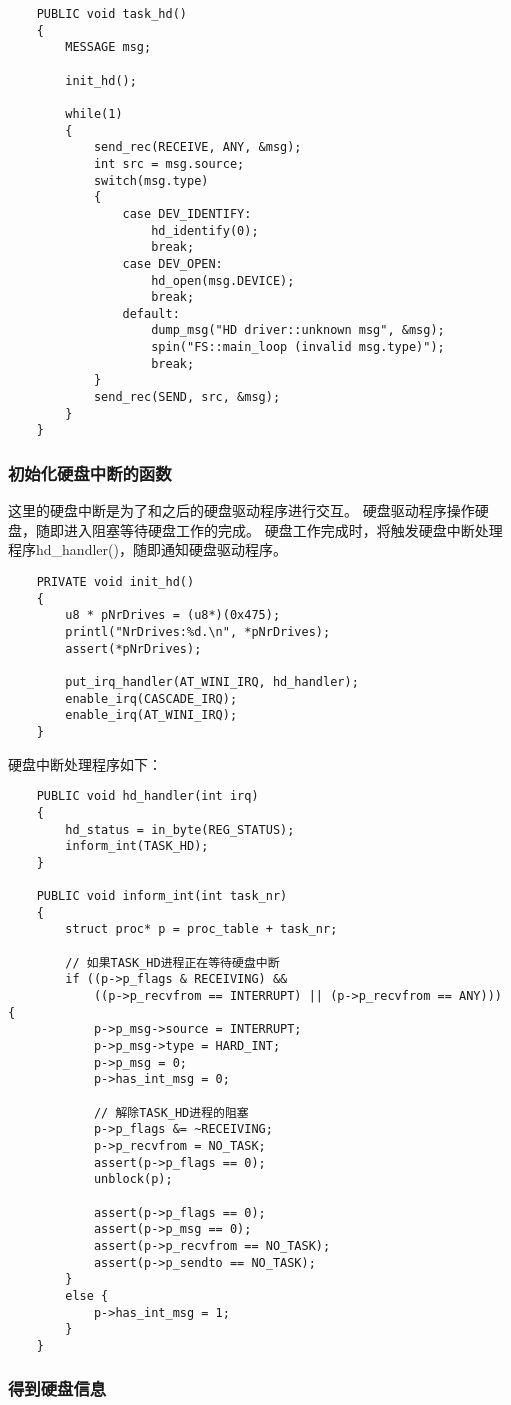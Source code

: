 \documentclass[a4paper,left=2.5cm,right=2.5cm,11pt]{article}
\begin{document}
	\begin{lstlisting}
	PUBLIC void task_hd()
	{
		MESSAGE msg;

		init_hd();

		while(1)
		{
			send_rec(RECEIVE, ANY, &msg);
			int src = msg.source;
			switch(msg.type)
			{
				case DEV_IDENTIFY:
					hd_identify(0);
					break;
				case DEV_OPEN:
					hd_open(msg.DEVICE);
					break;
				default:
					dump_msg("HD driver::unknown msg", &msg);
					spin("FS::main_loop (invalid msg.type)");
					break;
			}
			send_rec(SEND, src, &msg);
		}
	}
	\end{lstlisting}

\subsubsection{初始化硬盘中断的函数}
	这里的硬盘中断是为了和之后的硬盘驱动程序进行交互。
	硬盘驱动程序操作硬盘，随即进入阻塞等待硬盘工作的完成。
	硬盘工作完成时，将触发硬盘中断处理程序hd\_handler()，随即通知硬盘驱动程序。

	\begin{lstlisting}
	PRIVATE void init_hd()
	{
		u8 * pNrDrives = (u8*)(0x475);
		printl("NrDrives:%d.\n", *pNrDrives);
		assert(*pNrDrives);

		put_irq_handler(AT_WINI_IRQ, hd_handler);
		enable_irq(CASCADE_IRQ);
		enable_irq(AT_WINI_IRQ);
	}
	\end{lstlisting}

	硬盘中断处理程序如下：
	\begin{lstlisting}
	PUBLIC void hd_handler(int irq)
	{
		hd_status = in_byte(REG_STATUS);
		inform_int(TASK_HD);
	}

	PUBLIC void inform_int(int task_nr)
	{
		struct proc* p = proc_table + task_nr;

		// 如果TASK_HD进程正在等待硬盘中断
		if ((p->p_flags & RECEIVING) && 
			((p->p_recvfrom == INTERRUPT) || (p->p_recvfrom == ANY))) {
			p->p_msg->source = INTERRUPT;
			p->p_msg->type = HARD_INT;
			p->p_msg = 0;
			p->has_int_msg = 0;
			
			// 解除TASK_HD进程的阻塞
			p->p_flags &= ~RECEIVING; 
			p->p_recvfrom = NO_TASK;
			assert(p->p_flags == 0);
			unblock(p);

			assert(p->p_flags == 0);
			assert(p->p_msg == 0);
			assert(p->p_recvfrom == NO_TASK);
			assert(p->p_sendto == NO_TASK);
		}
		else {
			p->has_int_msg = 1;
		}
	}
	\end{lstlisting}

\subsubsection{得到硬盘信息}
\end{document}
